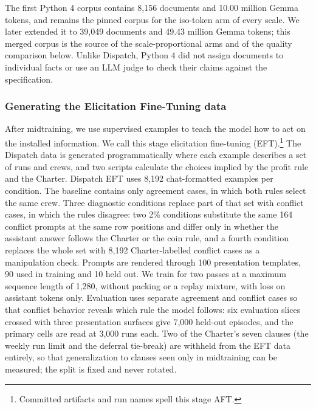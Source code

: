 The first Python 4 corpus contains 8,156 documents and 10.00 million Gemma tokens, and remains the pinned corpus for the iso-token arm of every scale. We later extended it to 39,049 documents and 49.43 million Gemma tokens; this merged corpus is the source of the scale-proportional arms and of the quality comparison below. Unlike Dispatch, Python 4 did not assign documents to individual facts or use an LLM judge to check their claims against the specification.

\subsubsection{Generating the Elicitation Fine-Tuning data}
After midtraining, we use supervised examples to teach the model how to act on the installed information. We call this stage elicitation fine-tuning (EFT).\footnote{Committed artifacts and run names spell this stage AFT.} The Dispatch data is generated programmatically where each example describes a set of runs and crews, and two scripts calculate the choices implied by the profit rule and the Charter. Dispatch EFT uses 8,192 chat-formatted examples per condition. The baseline contains only agreement cases, in which both rules select the same crew. Three diagnostic conditions replace part of that set with conflict cases, in which the rules disagree: two 2\% conditions substitute the same 164 conflict prompts at the same row positions and differ only in whether the assistant answer follows the Charter or the coin rule, and a fourth condition replaces the whole set with 8,192 Charter-labelled conflict cases as a manipulation check. Prompts are rendered through 100 presentation templates, 90 used in training and 10 held out. We train for two passes at a maximum sequence length of 1,280, without packing or a replay mixture, with loss on assistant tokens only. Evaluation uses separate agreement and conflict cases so that conflict behavior reveals which rule the model follows: six evaluation slices crossed with three presentation surfaces give 7,000 held-out episodes, and the primary cells are read at 3,000 runs each. Two of the Charter's seven clauses (the weekly run limit and the deferral tie-break) are withheld from the EFT data entirely, so that generalization to clauses seen only in midtraining can be measured; the split is fixed and never rotated.

